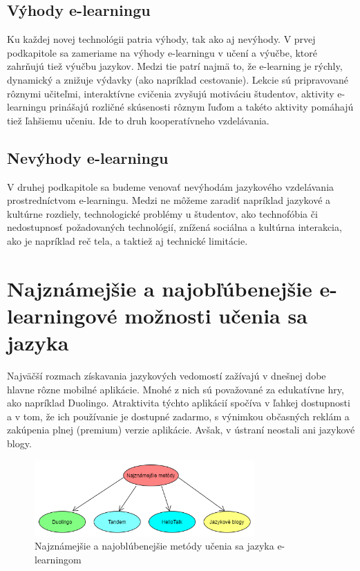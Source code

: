\documentclass[10pt,oneside,slovak,a4paper]{article}
\begin{document}
\subsection{Výhody e-learningu}%
Ku každej novej technológii patria výhody, tak ako aj nevýhody. V prvej podkapitole sa zameriame na výhody e-learningu v učení a výučbe, ktoré zahrňujú tiež výučbu jazykov. Medzi tie patrí najmä to, že e-learning je rýchly, dynamický a znižuje výdavky (ako napríklad cestovanie). \cite{efektivnost}
  Lekcie sú pripravované rôznymi učiteľmi, \cite{efektivnost}
 interaktívne cvičenia zvyšujú motiváciu študentov, \cite{vyhody}
 aktivity e-learningu prinášajú rozličné skúsenosti rôznym ľuďom a takéto aktivity pomáhajú tiež ľahšiemu učeniu. \cite{vyhody}
 Ide to druh kooperatívneho vzdelávania. \cite{efektivnost}

\subsection{Nevýhody e-learningu}%
V druhej podkapitole sa budeme venovať nevýhodám jazykového vzdelávania prostredníctvom e-learningu. Medzi ne môžeme zaradiť napríklad
 jazykové a kultúrne rozdiely, \cite{efektivnost}
 technologické problémy u študentov, ako technofóbia či  nedostupnosť požadovaných technológií, \cite{nevyhody}
 znížená sociálna a kultúrna interakcia, ako je napríklad reč tela,\cite{nevyhody} a taktiež aj 
 technické limitácie.\cite{efektivnost}


\section{Najznámejšie a najobľúbenejšie e-learningové možnosti učenia sa jazyka}%
\label{2}
Najväčší rozmach získavania jazykových vedomostí zažívajú v dnešnej dobe hlavne rôzne mobilné aplikácie. Mnohé z nich sú považované za edukatívne hry, ako napríklad Duolingo. Atraktivita týchto aplikácií spočíva v ľahkej dostupnosti a v tom, že ich používanie je dostupné zadarmo, s výnimkou občasných reklám a zakúpenia plnej (premium) verzie aplikácie. Avšak, v ústraní neostali ani jazykové blogy.

\begin{figure}[h] %
\centering
\includegraphics[width=0.75\textwidth,height=0.15\textheight]{metody.png}
\caption{Najznámejšie a najoblúbenejšie metódy učenia sa jazyka e-learningom}
\label{diagram}
\end{figure}
\end{document}
